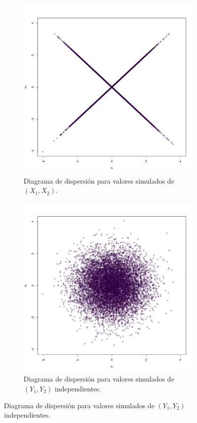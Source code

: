 \documentclass[11pt,a4paper]{article}
\begin{document}
\begin{figure}[H]
    \centering
    \begin{subfigure}[t]{0.45\textwidth}
        \centering
        \includegraphics[width=\linewidth]{correlation.png} 
        \caption{Diagrama de dispersión para valores simulados de $(X_1, X_2)$.} \label{fig:corr1}
    \end{subfigure}
    \hfill
    \begin{subfigure}[t]{0.45\textwidth}
        \centering
        \includegraphics[width=\linewidth]{correlation_ind.png} 
        \caption{Diagrama de dispersión para valores simulados de $(Y_1, Y_2)$ independientes.} \label{fig:corr2}
    \end{subfigure}
    

\end{figure}
\end{document}
